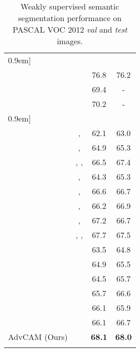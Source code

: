 \documentclass[final]{cvpr}
\begin{document}
\begin{table}[t]
\renewcommand{\arraystretch}{0.95}
\centering
  \caption{Weakly supervised semantic segmentation performance on PASCAL VOC 2012 \textit{val} and \textit{test} images.}\label{table_semantic}
\vspace{-0.7em}
\begin{threeparttable}
\begin{tabular}{l@{\hskip 0.3in}c@{\hskip 0.3in}cc}
    \Xhline{1pt}\-0.9em]
    
    \multicolumn{4}{l}{Supervision: Stronger than image labels} \\
    ~\cite{chen2017deeplab}  &   & 76.8  & 76.2 \\
    ~\cite{khoreva2017simple}   &  & 69.4  & -  \\
    ~\cite{song2019box}   &  & 70.2  & - \\
\-0.9em]
    \multicolumn{3}{l}{Supervision: Image-level tags}\\
~\cite{li2019attention}   &   ,  & 62.1  & 63.0  \\
~\cite{lee2019ficklenet}  & ,  & 64.9 & 65.3\\
    ~\cite{lee2019frame}   & , ,   & 66.5  & 67.4  \\
~\cite{fan2018cian}    & ,  & 64.3  & 65.3 \\
    ~\cite{zhangsplitting}   & ,   & 66.6  & 66.7  \\
    ~\cite{sun2020mining}   & ,   & 66.2  & 66.9  \\
    ~\cite{fanemploying}   & ,   & 67.2  & 66.7  \\
    ~\cite{sun2020mining}   & , ,   & 67.7  & 67.5  \\
    
    ~\cite{ahn2019weakly}  &   & 63.5 & 64.8 \\
    ~\cite{Shimoda_2019_ICCV}    &    & 64.9  & 65.5\\
    ~\cite{wang2020self}    &  & 64.5  & 65.7 \\
~\cite{chenweakly}   &    & 65.7  & 66.6  \\

    ~\cite{chang2020weakly}   &   & 66.1  & 65.9\\


    ~\cite{zhang2020causal}   &   & 66.1  & 66.7  \\

    AdvCAM (Ours) &  & \textbf{68.1} & \textbf{68.0}  \\
\Xhline{1pt}
    

\end{tabular}
\end{threeparttable}
\end{table}
\end{document}
